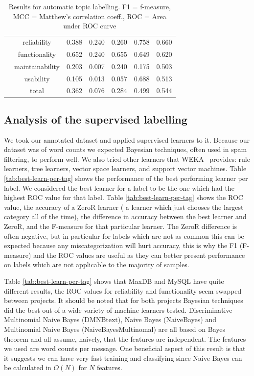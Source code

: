 \documentclass{acm_proc_article-sp}
\begin{document}
\begin{table}[h]
\begin{tabular}{c|c|c|c|c|c|c}
 & reliability & 0.388 & 0.240 & 0.260 & 0.758 & 0.660 \\ 
 & functionality & 0.652 & 0.240 & 0.655 & 0.649 & 0.620 \\ 
 & maintainability & 0.203 & 0.007 & 0.240 & 0.175 & 0.503 \\ 
 & usability & 0.105 & 0.013 & 0.057 & 0.688 & 0.513 \\ 
 & total & 0.362 & 0.076 & 0.284 & 0.499 & 0.544 \\
\bottomrule
\end{tabular}
	\caption{Results for automatic topic labelling. F1 = f-measure, MCC = Matthew's correlation coeff., ROC = Area under ROC curve}
	\label{tbl:maxdb-unsup-results}
\end{table}

\subsection{Analysis of the supervised labelling}
\label{sec:suplabelling}

We took our annotated dataset and applied supervised learners to it. Because our dataset was of word counts we expected Bayesian techniques, often used in spam filtering, to perform well. We also tried other learners that WEKA~\cite{weka09} provides: rule learners, tree learners, vector space learners, and support vector machines.  Table \ref{tab:best-learn-per-tag} shows the performance of the best performing learner per label.  We considered the best learner for a label to be the one which had the highest ROC value for that label. Table \ref{tab:best-learn-per-tag} shows the ROC value, the accuracy of a ZeroR learner ( a learner which just chooses the largest category all of the time), the difference in accuracy between the best learner and ZeroR, and the F-measure for that particular learner. The ZeroR difference is often negative, but in particular for labels which are not as common this can be expected because any miscategorization will hurt accuracy, this is why the F1 (F-measure) and the ROC values are useful as they can better present performance on labels which are not applicable to the majority of samples.

Table \ref{tab:best-learn-per-tag} shows that MaxDB and MySQL have quite different results, the ROC values for reliability and functionality seem swapped between projects. It should be noted that for both projects Bayesian techniques did the best out of a wide variety of machine learners tested. Discriminative Multinomial Naive Bayes (DMNBtext), Naive Bayes (NaiveBayes) and Multinomial Naive Bayes (NaiveBayesMultinomal) are all based on Bayes theorem and all assume, naively, that the features are independent. The features we used are word counts per message. One beneficial aspect of this result is that it suggests we can have very fast training and classifying  since Naive Bayes can be calculated in $O(N)$ for $N$ features.
\end{document}
